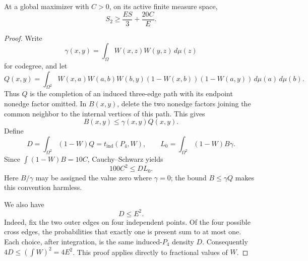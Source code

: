 \begin{lemma}\label{lem:second-order-moment}
At a global maximizer with \(C>0\), on its active finite measure space,
\begin{equation}
 S_2\ge\frac{ES}{3}+\frac{20C}{E}.\tag{16}
\end{equation}
\end{lemma}
\begin{proof}
Write
\[
 \gamma(x,y)=\int_\Omega W(x,z)W(y,z)\,d\mu(z)
\]
for codegree, and let
\[
 Q(x,y)=\int_{\Omega^2}
 W(x,a)W(a,b)W(b,y)(1-W(x,b))(1-W(a,y))\,d\mu(a)\,d\mu(b).
\]
Thus \(Q\) is the completion of an induced three-edge path with its
endpoint nonedge factor omitted. In \(B(x,y)\), delete the two nonedge
factors joining the common neighbor to the internal vertices of this path.
This gives
\[
 B(x,y)\le\gamma(x,y)Q(x,y).
\]
Define
\[
 D=\int_{\Omega^2}(1-W)Q=t_{\mathrm{ind}}(P_4,W),\qquad
 L_0=\int_{\Omega^2}(1-W)B\gamma.
\]
Since \(\int(1-W)B=10C\), Cauchy--Schwarz yields
\begin{equation}
 100C^2\le DL_0.\tag{17}
\end{equation}
Here \(B/\gamma\) may be assigned the value zero where \(\gamma=0\);
the bound \(B\le\gamma Q\) makes this convention harmless.

We also have
\begin{equation}
 D\le E^2.\tag{18}
\end{equation}
Indeed, fix the two outer edges on four independent points. Of the four
possible cross edges, the probabilities that exactly one is present sum
to at most one. Each choice, after integration, is the same induced-\(P_4\)
density \(D\). Consequently \(4D\le(\int W)^2=4E^2\). This proof applies
directly to fractional values of \(W\).


\end{proof}
